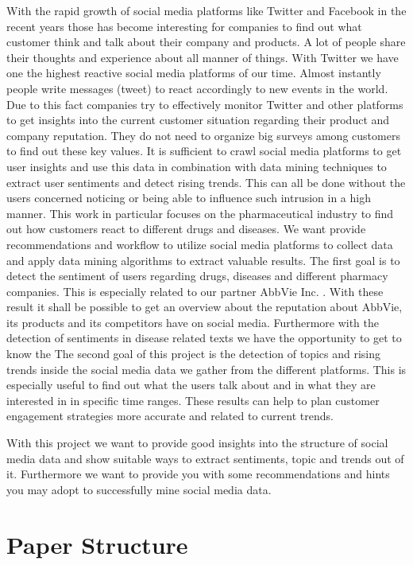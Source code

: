 \documentclass[11pt,titlepage,oneside,openany]{book}
\begin{document}
With the rapid growth of social media platforms like Twitter and Facebook in the recent years those has become interesting for companies to find out what customer think and talk about their company and products. A lot of people share their thoughts and experience about all manner of things. With Twitter we have one the highest reactive social media platforms of our time. Almost instantly people write messages (tweet) to react accordingly to new events in the world. Due to this fact companies try to effectively monitor Twitter and other platforms to get insights into the current customer situation regarding their product and company reputation. They do not need to organize big surveys among customers to find out these key values. It is sufficient to crawl social media platforms to get user insights and use this data in combination with data mining techniques to extract user sentiments and detect rising trends. This can all be done without the users concerned noticing or being able to influence such intrusion in a high manner. 
This work in particular focuses on the pharmaceutical industry to find out how customers react to different drugs and diseases. We want provide recommendations and workflow to utilize social media platforms to collect data and apply data mining algorithms to extract valuable results. The first goal is to detect the sentiment of users regarding drugs, diseases and different pharmacy companies. This is especially related to our partner AbbVie Inc. . With these result it shall be possible to get an overview about the reputation about AbbVie, its products and its competitors have on social media. Furthermore with the detection of sentiments in disease related texts we have the opportunity to get to know the 
The second goal of this project is the detection of topics and rising trends inside the social media data we gather from the different platforms. This is especially useful to find out what the users talk about and in what they are interested in in specific time ranges. These results can help to plan customer engagement strategies more accurate and related to current trends. 

With this project we want to provide good insights into the structure of social media data and show suitable ways to extract sentiments, topic and trends out of it. Furthermore we want to provide you with some recommendations and hints you may adopt to successfully mine social media data.
 
 

\section{Paper Structure}
\end{document}
